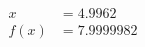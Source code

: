 \documentclass[preview]{standalone}
\begin{document}
\begin{align*}
x &= 4.9962\\f(x) &= 7.9999982
\end{align*}
\end{document}
